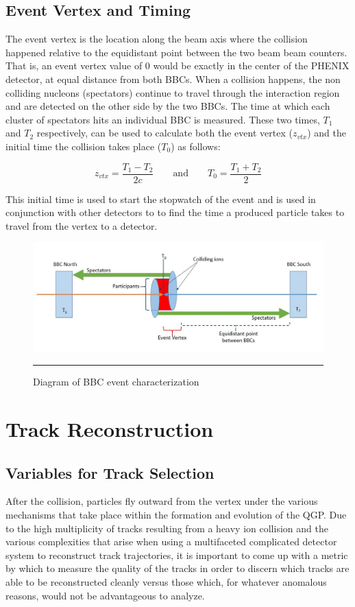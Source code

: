 \subsection{Event Vertex and Timing}
The event vertex is the location along the beam axis where the collision happened relative to the equidistant point between the two beam beam counters. That is, an event vertex value of 0 would be exactly in the center of the PHENIX detector, at equal distance from both BBCs. When a collision happens, the non colliding nucleons (spectators) continue to travel through the interaction region and are detected on the other side by the two BBCs. The time at which each cluster of spectators hits an individual BBC is measured. These two times, $T_1$ and $T_2$ respectively, can be used to calculate both the event vertex ($z_{vtx}$) and the initial time the collision takes place ($T_0$) as follows\citep{Mitchell:2002wu}:

\begin{equation}
 z_{vtx} = \frac{T_1 - T_2}{2c} \qquad\text{and}\qquad T_0 = \frac{T_1 + T_2}{2}
\end{equation}

This initial time is used to start the stopwatch of the event and is used in conjunction with other detectors to to find the time a produced particle takes to travel from the vertex to a detector.

\begin{figure}[htbp!]
  \centering
    \includegraphics[width=1\textwidth]{Figures/BBCevtchar.JPG}
    \rule{35em}{0.5pt}
  \caption[Diagram of BBC event characterization]{Diagram of BBC event characterization}
  \label{fig:bbcvtx}
\end{figure}

\section{Track Reconstruction}
\label{trkrecosect}
\subsection{Variables for Track Selection}
After the collision, particles fly outward from the vertex under the various mechanisms that take place within the formation and evolution of the QGP. Due to the high multiplicity of tracks resulting from a heavy ion collision and the various complexities that arise when using a multifaceted complicated detector system to reconstruct track trajectories, it is important to come up with a metric by which to measure the quality of the tracks in order to discern which tracks are able to be reconstructed cleanly versus those which, for whatever anomalous reasons, would not be advantageous to analyze.
